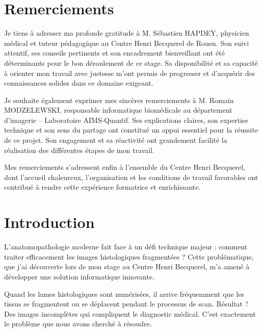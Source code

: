 \documentclass[11pt,a4paper]{report}
\begin{document}
\chapter*{Remerciements}

Je tiens à adresser ma profonde gratitude à M. Sébastien HAPDEY, physicien médical et tuteur pédagogique au Centre Henri Becquerel de Rouen. Son suivi attentif, ses conseils pertinents et son encadrement bienveillant ont été déterminants pour le bon déroulement de ce stage. Sa disponibilité et sa capacité à orienter mon travail avec justesse m'ont permis de progresser et d'acquérir des connaissances solides dans ce domaine exigeant.

Je souhaite également exprimer mes sincères remerciements à M. Romain MODZELEWSKI, responsable informatique biomédicale au département d'imagerie – Laboratoire AIMS-Quantif. Ses explications claires, son expertise technique et son sens du partage ont constitué un appui essentiel pour la réussite de ce projet. Son engagement et sa réactivité ont grandement facilité la réalisation des différentes étapes de mon travail.

Mes remerciements s'adressent enfin à l'ensemble du Centre Henri Becquerel, dont l'accueil chaleureux, l'organisation et les conditions de travail favorables ont contribué à rendre cette expérience formatrice et enrichissante.

\tableofcontents
\newpage

\listoffigures
\newpage

\listoftables
\newpage

\chapter*{Introduction}

L'anatomopathologie moderne fait face à un défi technique majeur : comment traiter efficacement les images histologiques fragmentées ? Cette problématique, que j'ai découverte lors de mon stage au Centre Henri Becquerel, m'a amené à développer une solution informatique innovante.

Quand les lames histologiques sont numérisées, il arrive fréquemment que les tissus se fragmentent ou se déplacent pendant le processus de scan. Résultat ? Des images incomplètes qui compliquent le diagnostic médical. C'est exactement le problème que nous avons cherché à résoudre.
\end{document}
